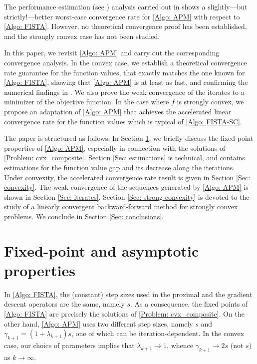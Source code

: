 \documentclass[pdflatex,sn-mathphys-num]{sn-jnl}
\theoremstyle{thmstyleone}
\theoremstyle{thmstyletwo}
\theoremstyle{thmstylethree}
\begin{document}
The performance estimation (see \cite{Drori_2014}) analysis carried out in \cite{Taylor_2017} shows a slightly---but strictly!---better worst-case convergence rate for \eqref{Algo: APM} with respect to \eqref{Algo: FISTA}. However, no theoretical convergence proof has been established, and the strongly convex case has not been studied.

In this paper, we revisit \eqref{Algo: APM} and carry out the corresponding convergence analysis. In the convex case, we establish a theoretical convergence rate guarantee for the function values, that exactly matches the one known for \eqref{Algo: FISTA}, showing that \eqref{Algo: APM} is at least as fast, and confirming the numerical findings in \cite{Taylor_2017}. We also prove the weak convergence of the iterates to a minimizer of the objective function. In the case where $f$ is strongly convex, we propose an adaptation of \eqref{Algo: APM} that achieves the accelerated linear convergence rate for the function values which is typical of \eqref{Algo: FISTA-SC}. 

The paper is structured as follows: In Section \ref{Sec: fixed_point}, we briefly discuss the fixed-point properties of \eqref{Algo: APM}, especially in connection with the solutions of \eqref{Problem: cvx_composite}. Section \ref{Sec: estimations} is technical, and contains estimations for the function value gap and its decrease along the iterations. Under convexity, the accelerated convergence rate result is given in Section \ref{Sec: convexity}. The weak convergence of the sequences generated by \eqref{Algo: APM} is shown in Section \ref{Sec: iterates}. Section \ref{Sec: strong convexity} is devoted to the study of a linearly convergent backward-forward method for strongly convex problems. We conclude in Section \ref{Sec: conclusions}. 




\section{Fixed-point and asymptotic properties} \label{Sec: fixed_point}
In \eqref{Algo: FISTA}, the (constant) step sizes used in the proximal and the gradient descent operators are the same, namely $s$. As a consequence, the fixed points of \eqref{Algo: FISTA} are precisely the solutions of \eqref{Problem: cvx_composite}. On the other hand, \eqref{Algo: APM} uses two different step sizes, namely $s$ and $\gamma_{k+1}=(1+\lambda_{k+1})s$, one of which can be iteration-dependent. In the convex case, our choice of parameters implies that $\lambda_{k+1}\to 1$, whence $\gamma_{k+1}\to 2s$ (not $s$) as $k\to\infty$. 
\end{document}
